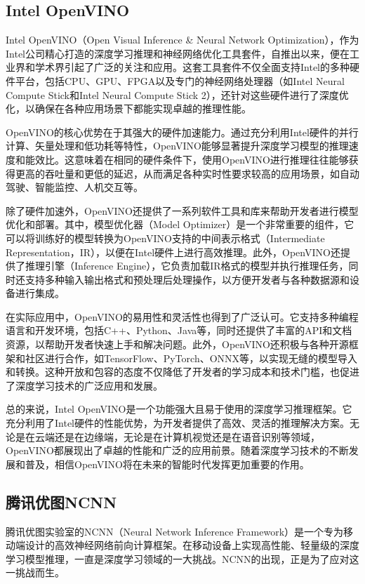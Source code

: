 \subsection{Intel OpenVINO}

Intel OpenVINO（Open Visual Inference \& Neural Network Optimization），作为Intel公司精心打造的深度学习推理和神经网络优化工具套件，自推出以来，便在工业界和学术界引起了广泛的关注和应用。这套工具套件不仅全面支持Intel的多种硬件平台，包括CPU、GPU、FPGA以及专门的神经网络处理器（如Intel Neural Compute Stick和Intel Neural Compute Stick 2），还针对这些硬件进行了深度优化，以确保在各种应用场景下都能实现卓越的推理性能。

OpenVINO的核心优势在于其强大的硬件加速能力。通过充分利用Intel硬件的并行计算、矢量处理和低功耗等特性，OpenVINO能够显著提升深度学习模型的推理速度和能效比。这意味着在相同的硬件条件下，使用OpenVINO进行推理往往能够获得更高的吞吐量和更低的延迟，从而满足各种实时性要求较高的应用场景，如自动驾驶、智能监控、人机交互等。

除了硬件加速外，OpenVINO还提供了一系列软件工具和库来帮助开发者进行模型优化和部署。其中，模型优化器（Model Optimizer）是一个非常重要的组件，它可以将训练好的模型转换为OpenVINO支持的中间表示格式（Intermediate Representation，IR），以便在Intel硬件上进行高效推理。此外，OpenVINO还提供了推理引擎（Inference Engine），它负责加载IR格式的模型并执行推理任务，同时还支持多种输入输出格式和预处理后处理操作，以方便开发者与各种数据源和设备进行集成。

在实际应用中，OpenVINO的易用性和灵活性也得到了广泛认可。它支持多种编程语言和开发环境，包括C++、Python、Java等，同时还提供了丰富的API和文档资源，以帮助开发者快速上手和解决问题。此外，OpenVINO还积极与各种开源框架和社区进行合作，如TensorFlow、PyTorch、ONNX等，以实现无缝的模型导入和转换。这种开放和包容的态度不仅降低了开发者的学习成本和技术门槛，也促进了深度学习技术的广泛应用和发展。

总的来说，Intel OpenVINO是一个功能强大且易于使用的深度学习推理框架。它充分利用了Intel硬件的性能优势，为开发者提供了高效、灵活的推理解决方案。无论是在云端还是在边缘端，无论是在计算机视觉还是在语音识别等领域，OpenVINO都展现出了卓越的性能和广泛的应用前景。随着深度学习技术的不断发展和普及，相信OpenVINO将在未来的智能时代发挥更加重要的作用。

\subsection{腾讯优图NCNN}

腾讯优图实验室的NCNN（Neural Network Inference Framework）是一个专为移动端设计的高效神经网络前向计算框架。在移动设备上实现高性能、轻量级的深度学习模型推理，一直是深度学习领域的一大挑战。NCNN的出现，正是为了应对这一挑战而生。

